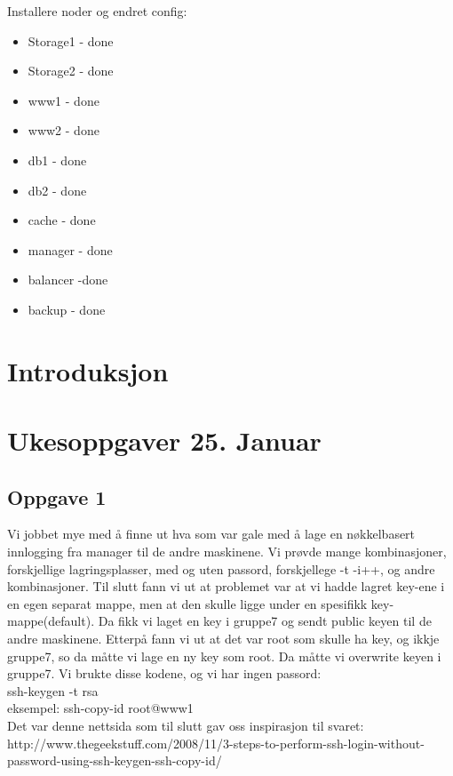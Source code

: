 \documentclass[a4paper, norsk, 12pt]{article}
\begin{document}
Installere noder og endret config:
\begin{itemize}
\item Storage1 - done
\item Storage2 - done
\item www1 - done
\item www2 - done
\item db1 - done
\item db2 - done
\item cache - done
\item manager - done
\item balancer -done
\item backup - done
\end{itemize}





\section{Introduksjon} 
\section{Ukesoppgaver 25. Januar}
\subsection*{Oppgave 1}
Vi jobbet mye med å finne ut hva som var gale med å lage en nøkkelbasert innlogging fra manager til de andre maskinene. Vi prøvde mange kombinasjoner, forskjellige lagringsplasser, med og uten passord, forskjellege -t -i++, og andre kombinasjoner. Til slutt fann vi ut at problemet var at vi hadde lagret key-ene i en egen separat mappe, men at den skulle ligge under en spesifikk key-mappe(default). Da fikk vi laget en key i gruppe7 og sendt public keyen til de andre maskinene. Etterpå fann vi ut at det var root som skulle ha key, og ikkje gruppe7, so da måtte vi lage en ny key som root. Da måtte  vi overwrite keyen i gruppe7. Vi brukte disse kodene, og vi har ingen passord:\\

  ssh-keygen -t rsa\\
  eksempel: ssh-copy-id root@www1\\
  
Det var denne nettsida som til slutt gav oss inspirasjon til svaret:\\
http://www.thegeekstuff.com/2008/11/3-steps-to-perform-ssh-login-without-password-using-ssh-keygen-ssh-copy-id/\\
\end{document}
